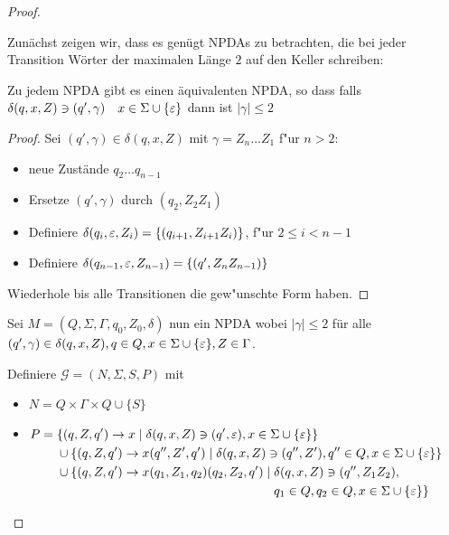 \begin{proof}
\begin{itemize}
    Zunächst zeigen wir, dass es genügt NPDAs zu betrachten, die bei jeder Transition Wörter der maximalen Länge $2$ auf den Keller schreiben:
\begin{lemma}
        Zu jedem \ac{NPDA} gibt es einen äquivalenten \ac{NPDA}, so dass
        falls $\delta(q,x,Z)\ni (q',\gamma) \quad x\in\Sigma\cup\{\varepsilon\}$
        dann ist $|\gamma| \le 2$
\end{lemma}
\begin{proof}
        Sei $(q',\gamma)\in\delta(q,x,Z)$ mit $\gamma = Z_n\dots Z_1$ f"ur $n>2$:
        \begin{itemize}
        \item   neue Zustände $q_2\dots q_{n-1}$
        \item Ersetze $(q',\gamma)$ durch $(q_2, Z_2Z_1)$
        \item Definiere $\delta(q_i, \varepsilon, Z_i) = \{ (q_{i+1}, Z_{i+1}Z_i) \}$, f"ur $2\le i < n-1$
        \item Definiere $\delta(q_{n-1}, \varepsilon, Z_{n-1}) = \{ (q', Z_nZ_{n-1}) \}$
        \end{itemize}
        Wiederhole bis alle Transitionen die gew"unschte Form haben. \qedhere
\end{proof}

Sei $M = (Q, \Sigma, \Gamma, q_0, Z_0, \delta)$ nun ein NPDA wobei $|\gamma| \le 2$ für alle $(q', \gamma) \in \delta(q, x, Z), q \in Q, x \in \Sigma \cup \{\varepsilon\}, Z \in \Gamma$.

    Definiere $\mathcal{G} = (N, \Sigma, S, P)$ mit
    \begin{itemize}
    \item $N = Q \times \Gamma \times Q \cup \{S\}$ 
    \item $P =
      \begin{aligned}[t]
        &\{ (q, Z, q') \to x \mid \delta(q, x, Z) \ni (q', \varepsilon), x \in \Sigma \cup \{\varepsilon\} \} \\
        &\cup  \{(q, Z, q') \to x(q'', Z', q') \mid \delta(q, x, Z) \ni (q'', Z'), q'' \in Q, x \in \Sigma \cup \{\varepsilon\}\} \\
        &\cup  \{(q, Z, q') \to x(q_1,Z_1,q_2)(q_2, Z_2, q') \mid 
        \begin{aligned}[t]
          & \delta(q, x, Z) \ni (q'', Z_1Z_2), \\
          & q_1 \in Q, q_2 \in Q, x \in \Sigma \cup \{\varepsilon\} \}
        \end{aligned}
      \end{aligned}$
    \end{itemize}


\end{itemize}
\end{proof}
